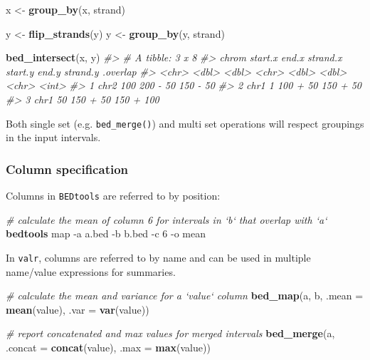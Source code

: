 \documentclass[9pt,a4paper]{extarticle}
\renewcommand{\KeywordTok}[1]{\textbf{{#1}}}
\renewcommand{\DataTypeTok}[1]{\textcolor[rgb]{0.50,0.00,0.00}{{#1}}}
\renewcommand{\StringTok}[1]{\textcolor[rgb]{0.87,0.00,0.00}{{#1}}}
\renewcommand{\CommentTok}[1]{\textcolor[rgb]{0.50,0.50,0.50}{\textit{{#1}}}}
\renewcommand{\NormalTok}[1]{{#1}}
\begin{document}
\begin{Highlighting}[]
\NormalTok{x <-}\StringTok{ }\KeywordTok{group_by}\NormalTok{(x, strand)}

\NormalTok{y <-}\StringTok{ }\KeywordTok{flip_strands}\NormalTok{(y)}
\NormalTok{y <-}\StringTok{ }\KeywordTok{group_by}\NormalTok{(y, strand)}

\KeywordTok{bed_intersect}\NormalTok{(x, y)}
\CommentTok{#> # A tibble: 3 x 8}
\CommentTok{#>   chrom start.x end.x strand.x start.y end.y strand.y .overlap}
\CommentTok{#>   <chr>   <dbl> <dbl>    <chr>   <dbl> <dbl>    <chr>    <int>}
\CommentTok{#> 1  chr2     100   200        -      50   150        -       50}
\CommentTok{#> 2  chr1       1   100        +      50   150        +       50}
\CommentTok{#> 3  chr1      50   150        +      50   150        +      100}
\end{Highlighting}

Both single set (e.g. \texttt{bed\_merge()}) and multi set operations
will respect groupings in the input intervals.

\subsubsection*{Column specification}\label{column-specification}

Columns in \texttt{BEDtools} are referred to by position:

\begin{Highlighting}[]
\CommentTok{# calculate the mean of column 6 for intervals in `b` that overlap with `a`}
\KeywordTok{bedtools} \NormalTok{map -a a.bed -b b.bed -c 6 -o mean}
\end{Highlighting}

In \texttt{valr}, columns are referred to by name and can be used in
multiple name/value expressions for summaries.

\begin{Highlighting}[]
\CommentTok{# calculate the mean and variance for a `value` column}
\KeywordTok{bed_map}\NormalTok{(a, b, }\DataTypeTok{.mean =} \KeywordTok{mean}\NormalTok{(value), }\DataTypeTok{.var =} \KeywordTok{var}\NormalTok{(value))}

\CommentTok{# report concatenated and max values for merged intervals}
\KeywordTok{bed_merge}\NormalTok{(a, }\DataTypeTok{.concat =} \KeywordTok{concat}\NormalTok{(value), }\DataTypeTok{.max =} \KeywordTok{max}\NormalTok{(value))}
\end{Highlighting}
\end{document}

